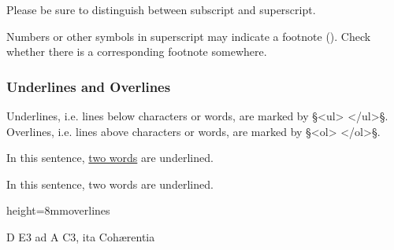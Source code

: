 \begin{note}
Please be sure to distinguish between subscript and superscript.
\end{note}

\begin{note}
Numbers or other symbols in superscript may indicate a footnote (). Check whether there is a corresponding footnote somewhere.
\end{note}

\subsubsection{Underlines and Overlines}
\label{section underlines and overlines}

\begin{mainrule}
Underlines, i.e. lines below characters or words, are marked by §<ul> </ul>§.
Overlines, i.e. lines above characters or words, are marked by §<ol> </ol>§.
\end{mainrule}


\vspace{3mm}
\begin{example}[ 1: \, underlines]

\vspace{-4mm}
In this sentence, \underline{two words} are underlined.

\vspace{-3mm}
\begin{typeLatin}
In this sentence, two words are underlined. \\
\end{typeLatin}
\end{example}

\begin{sampleImageSmall}[ 2: \, overlines]{height=8mm}{overlines}

\begin{typeLatin}
D E3\bold{</^>} ad A C3\bold{</^>}, ita Cohærentia \\
\end{typeLatin}
\end{sampleImageSmall}

